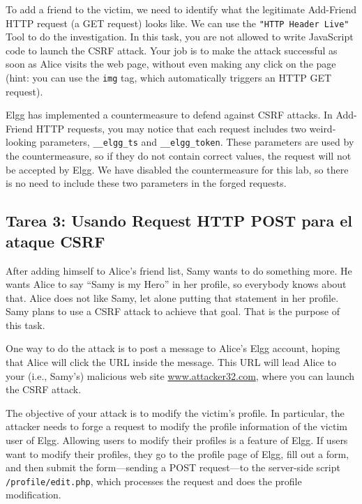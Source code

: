 To add a friend to the victim, we need to identify what the legitimate 
Add-Friend HTTP request (a GET request) looks like. We can use 
the \texttt{"HTTP Header Live"} Tool to do the investigation. 
In this task, you are not allowed to
write JavaScript code to launch the CSRF attack. Your job is to make the
attack successful as soon as Alice visits the web page, without even making
any click on the page (hint: you can use the {\tt img} tag, which
automatically triggers an HTTP GET request).
 

Elgg has implemented a countermeasure to defend against 
CSRF attacks. In Add-Friend HTTP requests, you may notice that each 
request includes two weird-looking parameters, \texttt{\_\_elgg\_ts} and 
\texttt{\_\_elgg\_token}. These parameters are used by the countermeasure, so if they do not
contain correct values, the request will not be accepted by Elgg.   
We have disabled the countermeasure for this lab, so there is no need to include these two 
parameters in the forged requests. 


\subsection{Tarea 3: Usando Request HTTP POST para el ataque CSRF}

After adding himself to Alice's friend list, Samy wants to do something more. He 
wants Alice to say ``Samy is my Hero'' in her profile, so everybody knows 
about that. Alice does not like Samy, let alone putting that statement 
in her profile. Samy plans to use a CSRF attack to achieve that goal. 
That is the purpose of this task. 


One way to do the attack is to post a message to Alice's Elgg account, hoping that 
Alice will click the URL inside the message. This URL will lead Alice to your (i.e., Samy's)
malicious web site \url{www.attacker32.com}, where you can launch the
CSRF attack. 

The objective of your attack is to modify the victim's profile. 
In particular, the attacker needs to forge a request 
to modify the profile information of the victim user of Elgg. 
Allowing users to modify their profiles is a feature of 
Elgg. If  users want to modify their profiles,
they go to the profile page of Elgg, fill out 
a form, and then submit the form---sending a POST request---to 
the server-side script {\tt /profile/edit.php}, which 
processes the request and does the profile modification.


